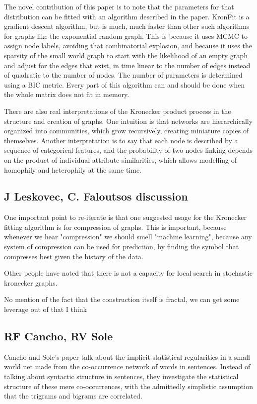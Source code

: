 \documentclass[12pt]{article}
\begin{document}
The novel contribution of this paper is to note that the parameters for that distribution can be fitted with an algorithm described in the paper. KronFit is a gradient descent algorithm, but is much, much faster than other such algorithms for graphs like the exponential random graph. This is because it uses MCMC to assign node labels, avoiding that combinatorial explosion, and because it uses the sparsity of the small world graph to start with the likelihood of an empty graph and adjust for the edges that exist, in time linear to the number of edges instead of quadratic to the number of nodes. The number of parameters is determined using a BIC metric. Every part of this algorithm can and should be done when the whole matrix does not fit in memory.

There are also real interpretations of the Kronecker product process in the structure and creation of graphs. One intuition is that networks are hierarchically organized into communities, which grow recursively, creating miniature copies of themselves. Another interpretation is to say that each node is described by a sequence of categorical features, and the probability of two nodes linking depends on the product of individual attribute similarities, which allows modelling of homophily and heterophily at the same time.

\subsection{J Leskovec, C. Faloutsos discussion}

One important point to re-iterate is that one suggested usage for the Kronecker fitting algorithm is for compression of graphs. This is important, because whenever we hear "compression" we should smell "machine learning", because any system of compression can be used for prediction, by finding the symbol that compresses best given the history of the data.

Other people have noted that there is not a capacity for local search in stochastic kronecker graphs. %

No mention of the fact that the construction itself is fractal, we can get some leverage out of that I think

\subsection{RF Cancho, RV Sole}
Cancho and Sole's paper talk about the implicit statistical regularities in a small world net made from the co-occurrence network of words in sentences. Instead of talking about syntactic structure in sentences, they investigate the statistical structure of these mere co-occurrences, with the admittedly simplistic assumption that the trigrams and bigrams are correlated.
\end{document}
